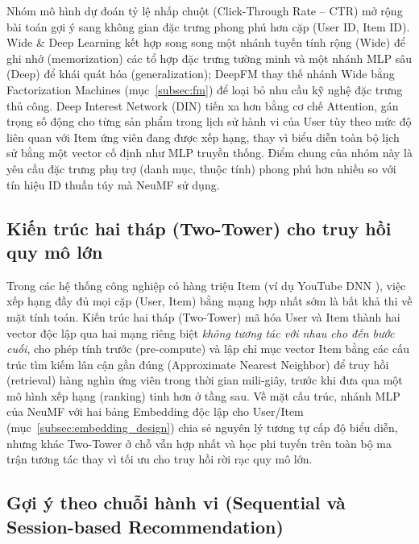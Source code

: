 Nhóm mô hình dự đoán tỷ lệ nhấp chuột (Click-Through Rate -- CTR) mở rộng bài toán gợi ý sang không gian đặc trưng phong phú hơn cặp (User ID, Item ID). Wide \& Deep Learning \parencite{cheng2016wide} kết hợp song song một nhánh tuyến tính rộng (Wide) để ghi nhớ (memorization) các tổ hợp đặc trưng tường minh và một nhánh MLP sâu (Deep) để khái quát hóa (generalization); DeepFM \parencite{guo2017deepfm} thay thế nhánh Wide bằng Factorization Machines (mục~\ref{subsec:fm}) để loại bỏ nhu cầu kỹ nghệ đặc trưng thủ công. Deep Interest Network (DIN) \parencite{zhou2018din} tiến xa hơn bằng cơ chế Attention, gán trọng số động cho từng sản phẩm trong lịch sử hành vi của User tùy theo mức độ liên quan với Item ứng viên đang được xếp hạng, thay vì biểu diễn toàn bộ lịch sử bằng một vector cố định như MLP truyền thống. Điểm chung của nhóm này là yêu cầu đặc trưng phụ trợ (danh mục, thuộc tính) phong phú hơn nhiều so với tín hiệu ID thuần túy mà NeuMF sử dụng.

\subsection{Kiến trúc hai tháp (Two-Tower) cho truy hồi quy mô lớn}
\label{subsec:two_tower}

Trong các hệ thống công nghiệp có hàng triệu Item (ví dụ YouTube DNN \parencite{covington2016youtube}), việc xếp hạng đầy đủ mọi cặp (User, Item) bằng mạng hợp nhất sớm là bất khả thi về mặt tính toán. Kiến trúc hai tháp (Two-Tower) mã hóa User và Item thành hai vector độc lập qua hai mạng riêng biệt \emph{không tương tác với nhau cho đến bước cuối}, cho phép tính trước (pre-compute) và lập chỉ mục vector Item bằng các cấu trúc tìm kiếm lân cận gần đúng (Approximate Nearest Neighbor) để truy hồi (retrieval) hàng nghìn ứng viên trong thời gian mili-giây, trước khi đưa qua một mô hình xếp hạng (ranking) tinh hơn ở tầng sau. Về mặt cấu trúc, nhánh MLP của NeuMF với hai bảng Embedding độc lập cho User/Item (mục~\ref{subsec:embedding_design}) chia sẻ nguyên lý tương tự cấp độ biểu diễn, nhưng khác Two-Tower ở chỗ vẫn hợp nhất và học phi tuyến trên toàn bộ ma trận tương tác thay vì tối ưu cho truy hồi rời rạc quy mô lớn.

\subsection{Gợi ý theo chuỗi hành vi (Sequential và Session-based Recommendation)}
\label{subsec:sequential_rec}

